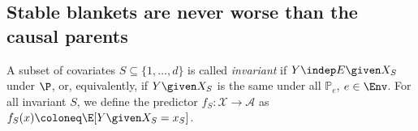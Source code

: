 \subsection{Stable blankets
are never worse than
the causal parents} \label{sec:stable_blanket}
\begin{definition} \label{def:inv_subset}
A subset of covariates $S \subseteq \{1, \ldots, d\}$ is called \emph{invariant} if $Y \indep E \given X_S$ under $\P$,
or, equivalently, if 
$Y \given X_S$ is the same under all $\mathbb{P}_e$, $e \in \Env$.
%
For all invariant  $S$, we define the 
predictor $f_S: \mathcal{X} \to \mathcal{A}$ as $ f_S(x) \coloneq \E[Y \given X_S = x_S]$.
\end{definition}








